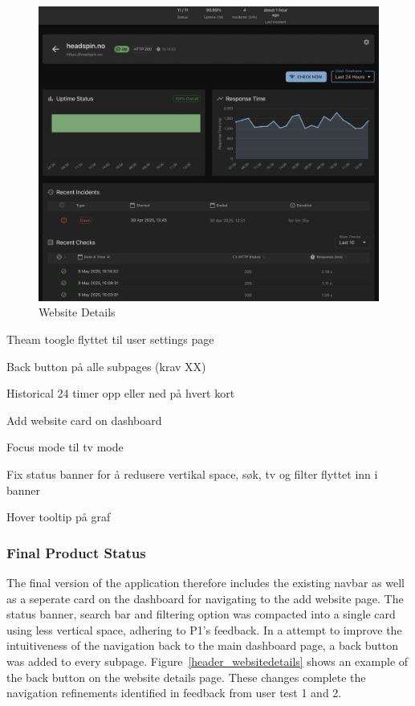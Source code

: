 \begin{figure}[H]
    \centering
    \includegraphics[width=1\linewidth]{figures/MVP-dashboard/MVP-websitedetails_full.png}
    \caption{Website Details}
    \label{fig:website_details_results}
\end{figure}

Theam toogle flyttet til user settings page

Back button på alle subpages (krav XX)

Historical 24 timer opp eller ned på hvert kort

Add website card on dashboard

Focus mode til tv mode

Fix status banner for å redusere vertikal space, søk, tv og filter flyttet inn i banner

Hover tooltip på graf

\subsubsection{Final Product Status}
The final version of the application therefore includes the existing navbar as well as a seperate card on the dashboard for navigating to the add website page. The status banner, search bar and filtering option was compacted into a single card using less vertical space, adhering to P1's feedback. In a attempt to improve the intuitiveness of the navigation back to the main dashboard page, a back button was added to  every subpage. Figure~\ref{header_websitedetails} shows an example of the back button on the website details page.
These changes complete the navigation refinements identified in feedback from user test 1 and 2.

